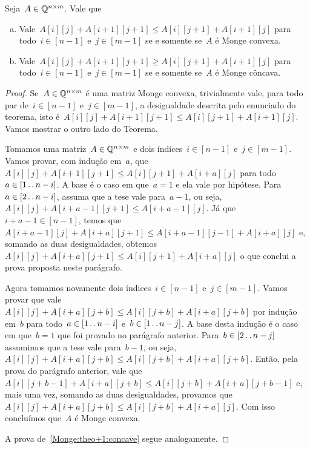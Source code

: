 \begin{theo} \label{Monge:theo+1}
Seja~$A \in \mathbb{Q}^{n \times m}$. Vale que

\begin{enumerate}[(a)]
\item Vale~${A[i][j] + A[i+1][j+1] \leq A[i][j+1] + A[i+1][j]}$ para todo~${i \in [n-1]}$ e~${j \in [m-1]}$ se e somente se~$A$ é Monge convexa. \label{Monge:theo+1:convex}

\item Vale~${A[i][j] + A[i+1][j+1] \geq A[i][j+1] + A[i+1][j]}$ para todo~${i \in [n-1]}$ e~${j \in [m-1]}$ se e somente se~$A$ é Monge côncava. \label{Monge:theo+1:concave}
\end{enumerate}
\end{theo}

\begin{proof}
Se~$A \in \mathbb{Q}^{n \times m}$ é uma matriz Monge convexa, trivialmente vale, para todo par de~${ i \in [n-1] }$ e~${ j \in [m-1] }$, a desigualdade descrita pelo enunciado do teorema, isto é~${ A[i][j] + A[i+1][j+1] \leq A[i][j+1] + A[i+1][j] }$. Vamos mostrar o outro lado do Teorema.

Tomamos uma matriz~$A \in \mathbb{Q}^{n \times m}$ e dois índices~${ i \in [n-1] }$ e~${ j \in [m-1] }$. Vamos provar, com indução em~$a$, que~${ A[i][j] + A[i+1][j+1] \leq A[i][j+1] + A[i+a][j] }$ para todo~${ a \in [1 \,.\,.\, n-i ] }$. A base é o caso em que~${ a = 1 }$ e ela vale por hipótese. Para~${ a \in [2 \,.\,.\, n-i] }$, assuma que a tese vale para~${ a-1 }$, ou seja,~${ A[i][j] + A[i + a - 1][j+1] \leq A[i + a - 1][j] }$. Já que~${ i + a - 1  \in [n-1] }$, temos que~${ A[i+a-1][j] + A[i+a][j+1] \leq A[i+a-1][j-1] + A[i+a][j] }$ e, somando as duas desigualdades, obtemos~${ A[i][j] + A[i+a][j+1] \leq A[i][j+1] + A[i+a][j] }$ o que conclui a prova proposta neste parágrafo.

Agora tomamos novamente dois índices~${ i \in [n-1] }$ e~${ j \in [m-1] }$. Vamos provar que vale~${ A[i][j] + A[i+a][j+b] \leq A[i][j+b] + A[i+a][j+b] }$ por indução em~$b$ para todo~${ a \in [1 \,.\,.\, n-i] }$ e~${ b \in [1 \,.\,.\, n-j] }$. A base desta indução é o caso em que~${ b = 1 }$ que foi provado no parágrafo anterior. Para~${ b \in [2 \,.\,.\, n-j] }$ assumimos que a tese vale para~${ b-1 }$, ou seja,~${ A[i][j] + A[i+a][j+b] \leq A[i][j+b] + A[i+a][j+b] }$. Então, pela prova do parágrafo anterior, vale que~${ A[i][j + b - 1] + A[i+a][j+b] \leq A[i][j+b] + A[i+a][j+b-1] }$ e, mais uma vez, somando as duas desigualdades, provamos que~${ A[i][j] + A[i+a][j+b] \leq A[i][j+b] + A[i+a][j] }$. Com isso concluímos que~$A$ é Monge convexa.

A prova de~\ref{Monge:theo+1:concave} segue analogamente.
\end{proof}

